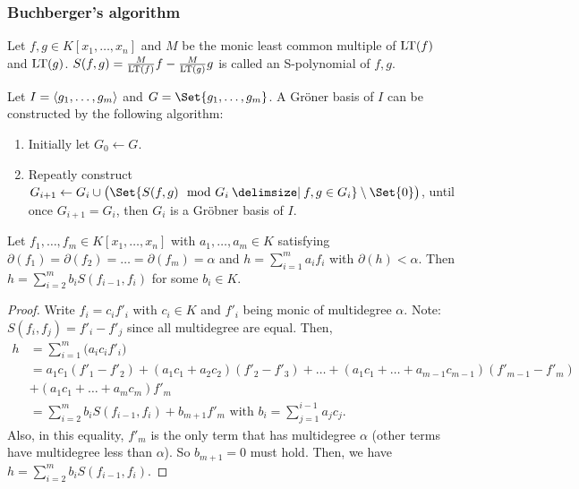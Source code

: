 \subsubsection{Buchberger's algorithm}

\begin{definition}
  Let $f,g \in K[x_1,\dots,x_n]$ and $M$ be the monic least common multiple of
  $\operatorname{LT}(f)$ and $\operatorname{LT}(g)$. $S(f,g) = \frac{M}{\operatorname{LT}(f)}f - \frac{M}{\operatorname{LT}(g)}g$ is
  called an S-polynomial of $f, g$.
\end{definition}

Let $I = \langle g_1, \dots, g_m \rangle$ and $G = \Set{ g_1, \dots, g_m }$.
A Gr\"{o}ner basis of $I$ can be constructed by the following algorithm:
\begin{enumerate}
  \item Initially let $G_0 \gets G$.
  \item Repeatly construct $G_{i+1} \gets G_i \cup \big(
    \Set{S(f, g) \mod G_i \given f, g \in G_i} \setminus \Set{0} \big)$,
    until once $G_{i+1} = G_i$, then $G_i$ is a Gr\"{o}bner basis of $I$.
\end{enumerate}

\begin{lemma} \label{lemma:sum-of-equal-degree-f-is-less}
  Let $f_1, \dots, f_m \in K[x_1, \dots, x_n]$ with $a_1, \dots, a_m \in K$
  satisfying $\partial(f_1) = \partial(f_2) = \dots = \partial(f_m) = \alpha$
  and $h =\sum_{i = 1}^m a_i f_i $ with $\partial(h) < \alpha$.
  Then $h = \sum_{i = 2}^m b_i S(f_{i-1}, f_i)$ for some $b_i \in K$.
  \begin{proof}
    Write $f_i = c_if'_i$ with $c_i \in K$ and $f'_i$ being monic of multidegree
    $\alpha$. Note: $S(f_i, f_j) = f'_i - f'_j$ since all multidegree are
    equal. Then, 
    \[
      \begin{split}
        h &= \sum_{i=1}^m \big( a_ic_if'_i \big) \\
        &= a_1c_1(f'_1-f'_2) + (a_1c_1+a_2c_2)(f'_2-f'_3) + \dots+ (a_1c_1 + \dots + a_{m-1}c_{m-1})(f'_{m-1}-f'_m) \\
        &+ (a_1c_1+\dots+a_mc_m)f'_m \\
        &= \sum\limits_{i=2}^m b_iS(f_{i-1},f_i) + b_{m+1}f'_m\text{ with }
        b_i = \sum_{j=1}^{i-1}a_jc_j.
      \end{split}
    \]
    Also, in this equality, $f'_m$ is the only term that has multidegree $\alpha$
    (other terms have multidegree less than $\alpha$). So $b_{m+1} = 0$ must hold.
    Then, we have $h = \sum_{i = 2}^m b_i S(f_{i-1}, f_i)$.
  \end{proof}
\end{lemma}

